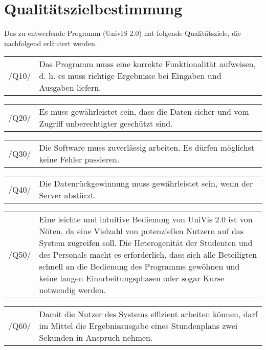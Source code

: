 \section{Qualitätszielbestimmung}
\label{sec:Qualitätszielbestimmung}

Das zu entwerfende Programm (UnivIS 2.0) hat folgende Qualitätsziele, die nachfolgend erläutert werden. 

\begin{tabular}{p{1.5cm}p{14.5cm}}
 /Q10/	& Das Programm muss eine korrekte Funktionalität aufweisen, d. h. es muss richtige Ergebnisse bei Eingaben und Ausgaben liefern. \\[0.25cm]	 
\end{tabular}

\begin{tabular}{p{1.5cm}p{14.5cm}}
 /Q20/	& Es muss gewährleistet sein, dass die Daten sicher und vom Zugriff unberechtigter geschützt sind. \\[0.25cm]	 
\end{tabular}

\begin{tabular}{p{1.5cm}p{14.5cm}}
 /Q30/	& Die Software muss zuverlässig arbeiten. Es dürfen möglichst keine Fehler passieren. \\[0.25cm]	 
\end{tabular}

\begin{tabular}{p{1.5cm}p{14.5cm}}
 /Q40/	& Die Datenrückgewinnung muss gewährleistet sein, wenn der Server abstürzt. \\[0.25cm]	 
\end{tabular}

\begin{tabular}{p{1.5cm}p{14.5cm}}
 /Q50/	& Eine leichte und intuitive Bedienung von UniVis 2.0 ist von Nöten, da eine Vielzahl von potenziellen Nutzern auf das System zugreifen soll. Die Heterogenität der Studenten und des Personals macht es erforderlich, dass sich alle Beteiligten schnell an die Bedienung des Programms gewöhnen und keine langen Einarbeitungsphasen oder sogar Kurse notwendig werden. \\[0.25cm]	 
\end{tabular}

\begin{tabular}{p{1.5cm}p{14.5cm}}
 /Q60/	& Damit die Nutzer des Systems effizient arbeiten können, darf im Mittel die Ergebnisausgabe eines Stundenplans zwei Sekunden in Anspruch nehmen. \\[0.25cm]	 
\end{tabular}

